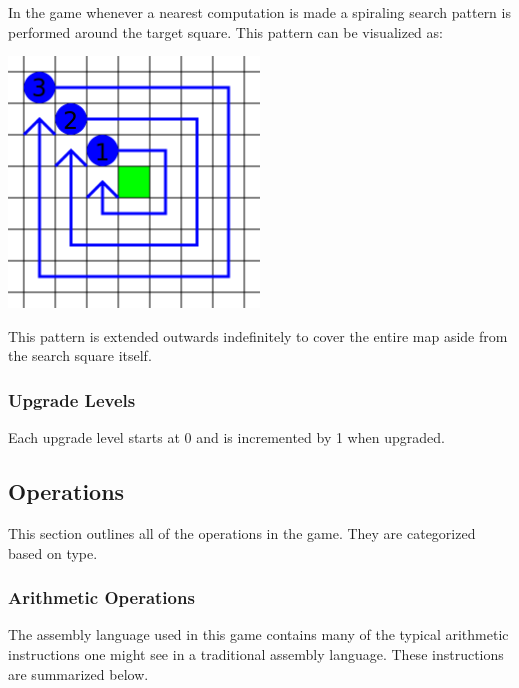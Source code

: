\documentclass{article}
\begin{document}
In the game whenever a nearest computation is made a spiraling search pattern is
performed around the target square. This pattern can be visualized as:

{\centering\includegraphics[width=0.5\textwidth]{res/nearest.png}\par}

This pattern is extended outwards indefinitely to cover the entire map aside
from the search square itself.

\subsubsection{Upgrade Levels}

Each upgrade level starts at 0 and is incremented by 1 when upgraded.

\subsection{Operations}

This section outlines all of the operations in the game. They are categorized
based on type.

\subsubsection{Arithmetic Operations}

The assembly language used in this game contains many of the typical
arithmetic instructions one might see in a traditional assembly language. These
instructions are summarized below.
\end{document}
